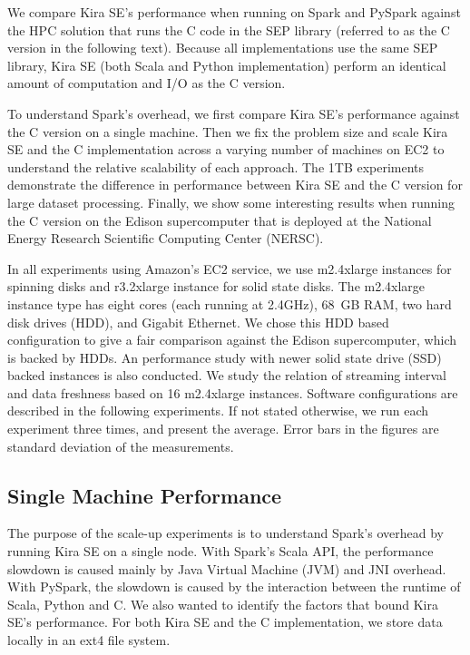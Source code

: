 \documentclass[10pt,journal,compsoc]{IEEEtran}
\begin{document}
We compare Kira SE's performance when running on Spark and PySpark against the HPC solution that runs
the C code in the SEP library (referred to as the C version in the following text). 
Because all implementations use the same SEP library, Kira SE (both Scala and Python implementation) 
perform an identical amount of computation and I/O as the C version.

To understand Spark's overhead, we first compare Kira SE's performance against the C version on a single
machine. Then we fix the problem size and scale Kira SE and the C implementation across a
varying number of machines on EC2 to understand the relative scalability of each approach.
The 1TB experiments demonstrate the difference in performance between Kira SE and the C version
for large dataset processing. Finally, we show some interesting results when running the C
version on the Edison supercomputer that is deployed at the National Energy Research Scientific Computing Center (NERSC).

In all experiments using Amazon's EC2 service, we use m2.4xlarge instances for spinning disks and r3.2xlarge instance for solid state disks.
The m2.4xlarge instance type has eight cores (each running at 2.4GHz), 68~GB RAM, two hard disk drives (HDD), and Gigabit Ethernet. 
We chose this HDD based configuration to give a fair comparison against the Edison supercomputer, which is backed by HDDs. 
An performance study with newer solid state drive (SSD) backed instances is also conducted.
We study the relation of streaming interval and data freshness based on 16 m2.4xlarge instances.
Software configurations are described in the following experiments.
If not stated otherwise, we run each experiment three times, and present the average.
Error bars in the figures are standard deviation of the measurements.

\subsection{Single Machine Performance}
\label{sec:Performance-scaleup}

The purpose of the scale-up experiments is to understand Spark's overhead by running
Kira SE on a single node. 
With Spark's Scala API, the performance slowdown is caused mainly by Java Virtual Machine (JVM) and JNI overhead.
With PySpark, the slowdown is caused by the interaction between the runtime of Scala, Python and C. 
We also wanted to identify the factors that bound Kira SE's performance. 
For both Kira SE and the C implementation, we store data locally in an ext4 file system.
\end{document}
